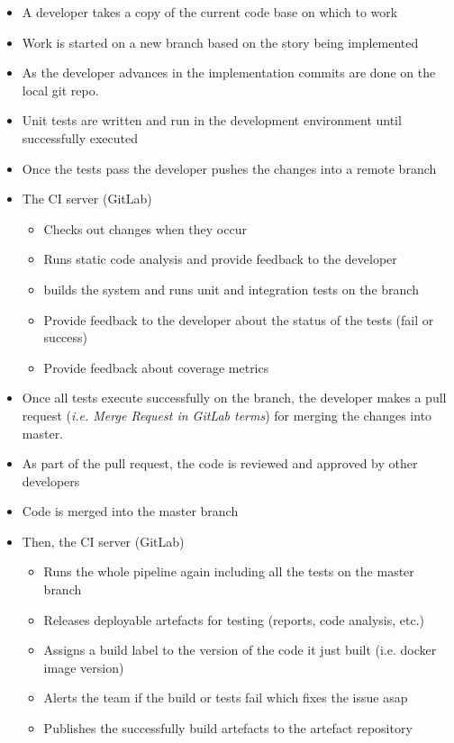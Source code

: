 \documentclass[a4paper,
               keeplastbox,   %
               ]{jacow}
\begin{document}
\begin{itemize}
    \item A developer takes a copy of the current code base on which to work
    \item Work is started on a new branch based on the story being implemented
    \item As the developer advances in the implementation commits are done on the local git repo.
    \item Unit tests are written and run in the development environment until successfully executed
    \item Once the tests pass the developer pushes the changes into a remote branch
    \item The CI server (GitLab)
    \begin{itemize}
        \item Checks out changes when they occur
        \item Runs static code analysis and provide feedback to the developer
        \item builds the system and runs unit and integration tests on the branch
        \item Provide feedback to the developer about the status of the tests (fail or success)
        \item Provide feedback about coverage metrics
    \end{itemize}
    \item Once all tests execute successfully on the branch, the developer makes a pull request (\textit{i.e. Merge Request in GitLab terms}) for merging the changes into master.
    \item As part of the pull request, the code is reviewed and approved by other developers
    \item Code is merged into the master branch
    \item Then, the CI server (GitLab)
    \begin{itemize}
        \item Runs the whole pipeline again including all the tests on the master branch
        \item Releases deployable artefacts for testing (reports, code analysis, etc.)
        \item Assigns a build label to the version of the code it just built (i.e. docker image version)
        \item Alerts the team if the build or tests fail which fixes the issue asap
        \item Publishes the successfully build artefacts to the artefact repository
    \end{itemize}
\end{itemize}
\end{document}
